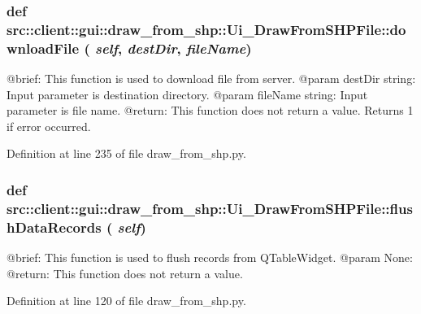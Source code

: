 \hypertarget{classsrc_1_1client_1_1gui_1_1draw__from__shp_1_1Ui__DrawFromSHPFile_a39d2ea2385e3f9f6e2a9bcc587c862b5}{
\subsubsection[{downloadFile}]{\setlength{\rightskip}{0pt plus 5cm}def src::client::gui::draw\_\-from\_\-shp::Ui\_\-DrawFromSHPFile::downloadFile ( {\em self}, \/   {\em destDir}, \/   {\em fileName})}}
\label{classsrc_1_1client_1_1gui_1_1draw__from__shp_1_1Ui__DrawFromSHPFile_a39d2ea2385e3f9f6e2a9bcc587c862b5}
\begin{DoxyVerb}
@brief: This function is used to download file from server.
@param destDir string: Input parameter is destination directory.
@param fileName string: Input parameter is file name. 
@return: This function does not return a value. Returns 1 if error occurred.
\end{DoxyVerb}
 

Definition at line 235 of file draw\_\-from\_\-shp.py.

\hypertarget{classsrc_1_1client_1_1gui_1_1draw__from__shp_1_1Ui__DrawFromSHPFile_a6fca0287d0c04cf97c3b1f58b4cb29a4}{
\subsubsection[{flushDataRecords}]{\setlength{\rightskip}{0pt plus 5cm}def src::client::gui::draw\_\-from\_\-shp::Ui\_\-DrawFromSHPFile::flushDataRecords ( {\em self})}}
\label{classsrc_1_1client_1_1gui_1_1draw__from__shp_1_1Ui__DrawFromSHPFile_a6fca0287d0c04cf97c3b1f58b4cb29a4}
\begin{DoxyVerb}
@brief: This function is used to flush records from QTableWidget.
@param None:
@return: This function does not return a value.
\end{DoxyVerb}
 

Definition at line 120 of file draw\_\-from\_\-shp.py.

